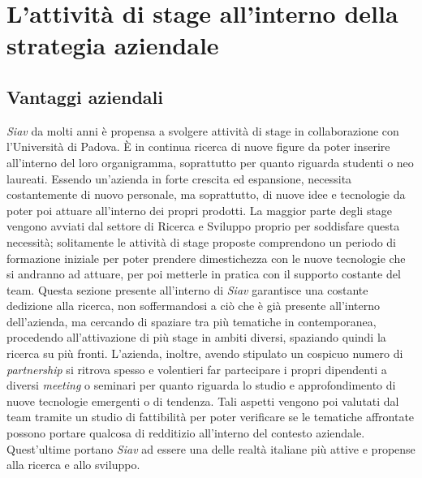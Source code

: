 
\chapter{L'attività di stage all'interno della strategia aziendale}
\label{cap:processi-metodologie}

\section{Vantaggi aziendali}
\textit{Siav} da molti anni è propensa a svolgere attività di stage in collaborazione con l'Università di Padova. È in continua ricerca di nuove figure da poter inserire all'interno del loro organigramma, soprattutto per quanto riguarda studenti o neo laureati.  Essendo un'azienda in forte crescita ed espansione, necessita costantemente di nuovo personale, ma soprattutto, di nuove idee e tecnologie da poter poi attuare all'interno dei propri prodotti. La maggior parte degli stage vengono avviati dal settore di Ricerca e Sviluppo proprio per soddisfare questa necessità; solitamente le attività di stage proposte comprendono un periodo di formazione iniziale per poter prendere dimestichezza con le nuove tecnologie che si andranno ad attuare, per poi metterle in pratica con il supporto costante del team. Questa sezione presente all'interno di \textit{Siav} garantisce una costante dedizione alla ricerca, non soffermandosi a ciò che è già presente all'interno dell'azienda, ma cercando di spaziare tra più tematiche in contemporanea, procedendo all'attivazione di più stage in ambiti diversi, spaziando quindi la ricerca su più fronti. L'azienda, inoltre, avendo stipulato un cospicuo numero di \textit{partnership} si ritrova spesso e volentieri far partecipare i propri dipendenti a diversi \textit{meeting} o seminari per quanto riguarda lo studio e approfondimento di nuove tecnologie emergenti o di tendenza. Tali aspetti vengono poi valutati dal team tramite un studio di fattibilità per poter verificare se le tematiche affrontate possono portare qualcosa di redditizio all'interno del contesto aziendale. Quest'ultime portano \textit{Siav} ad essere una delle realtà italiane più attive e propense alla ricerca e allo sviluppo.
\newpage
